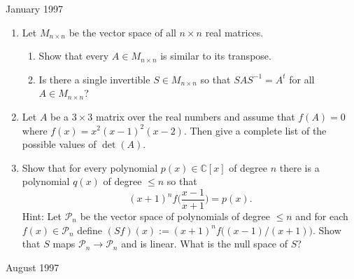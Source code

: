 \documentclass[11pt]{amsart}
\renewcommand{\(}{\left(}
\renewcommand{\)}{\right)}
\renewcommand{\[}{\left[}
\renewcommand{\]}{\right]}
\newcommand{\heading}[1]{\centerline{\large\sc #1}}
\newcommand{\num}{\begin{enumerate}}
\newcommand{\enum}{\end{enumerate}}
\begin{document}
\heading{January 1997}
\num
\item Let $M_{n\times n}$ be the vector space of all $n\times n$ real
matrices.
\num 
\item Show that every $A\in M_{n\times n}$ is similar to its transpose.
\item Is there a single invertible $S\in M_{n\times n}$ so that
$SAS^{-1}=A^t$ for all $A\in M_{n\times n}$?
\enum
\item Let $A$ be a $3\times 3$ matrix over the real numbers and assume
that $f(A)=0$ where $f(x)=x^2(x-1)^2(x-2)$.  Then give a complete
list of the possible values of $\det(A)$.
\item Show that for every polynomial $p(x)\in \mathbb{C}[x]$ of degree
$n$ there is a polynomial $q(x)$ of degree $\le n$ so that
$$
(x+1)^nf\Big(\frac{x-1}{x+1}\Big)=p(x).
$$
{\sc Hint:} Let $\mathcal{P}_n$ be the vector space of polynomials of
degree $\le n$ and for each $f(x)\in \mathcal{P}_n$ define
$(Sf)(x):=(x+1)^nf\big((x-1)/(x+1)\big)$.  Show that $S$ maps
$\mathcal{P}_n\to \mathcal{P}_n$ and is linear.  What is the null
space of $S$?
\enum
\pagebreak


\heading{August 1997}
\end{document}
